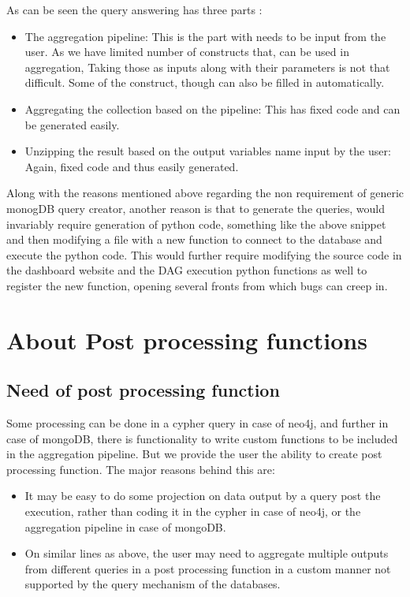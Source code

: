 \documentclass[letterpaper,10pt,english]{sphinxmanual}
\begin{document}
As can be seen the query answering has three parts :
\begin{itemize}
\item {} 
The aggregation pipeline: This is the part with needs to be input from the user. As we have limited number of constructs that, can be used in aggregation, Taking those as inputs along with their parameters is not that difficult. Some of the construct, though can also be filled in automatically.

\item {} 
Aggregating the collection based on the pipeline: This has fixed code and can be generated easily.

\item {} 
Unzipping the result based on the output variables name input by the user: Again, fixed code and thus easily generated.

\end{itemize}

Along with the reasons mentioned above regarding the non requirement of generic monogDB query creator, another reason is that to generate the queries, would invariably require generation of python code, something like the above snippet and then modifying a file with a new function to connect to the database and execute the python code. This would further require modifying the source code in the dashboard website and the DAG execution python functions as well to register the new function, opening several fronts from which bugs can creep in.


\chapter{About Post processing functions}
\label{\detokenize{postprocessing:about-post-processing-functions}}\label{\detokenize{postprocessing::doc}}

\section{Need of post processing function}
\label{\detokenize{postprocessing:need-of-post-processing-function}}
Some processing can be done in a cypher query in case of neo4j, and further in case of mongoDB, there is functionality to write custom functions to be included in the aggregation pipeline. But we provide the user the ability to create post processing function. The major reasons behind this are:
\begin{itemize}
\item {} 
It may be easy to do some projection on data output by a query post the execution, rather than coding it in the cypher in case of neo4j, or the aggregation pipeline in case of mongoDB.

\item {} 
On similar lines as above, the user may need to aggregate multiple outputs from different queries in a post processing function in a custom manner not supported by the query mechanism of the databases.

\end{itemize}
\end{document}
